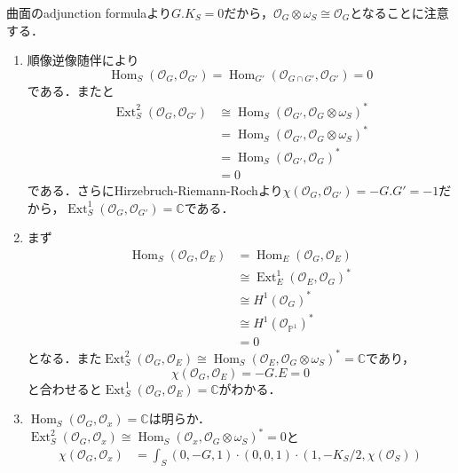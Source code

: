 \documentclass[uplatex,a4paper,11pt,dvipdfmx]{jsarticle}
\makeatletter
\theoremstyle{mystyle} %
\renewenvironment{proof}[1][\proofname]{\par
 \pushQED{\qed}%
 \normalfont \topsep6\p@\@plus6\p@\relax
 \trivlist
 \item[\hskip\labelsep
 \itshape
 {\bf\underline{#1}}]\ignorespaces
}{%
 \popQED\endtrivlist\@endpefalse
}
\DeclareMathOperator{\Hom}{Hom}
\DeclareMathOperator{\Ext}{Ext}
\makeatother
\begin{document}
\begin{proof}
	曲面のadjunction formulaより$G.K_S = 0$だから，$\mathcal{O}_G \otimes \omega_S \cong \mathcal{O}_G$となることに注意する．
	\begin{enumerate}
		\item 順像逆像随伴により$$\Hom_S(\mathcal{O}_G, \mathcal{O}_{G'}) = \Hom_{G'}(\mathcal{O}_{G\cap G'}, \mathcal{O}_{G'}) = 0$$である．またと
		      \begin{align*}
			      \Ext_S^2(\mathcal{O}_G, \mathcal{O}_{G'}) & \cong \Hom_S(\mathcal{O}_{G'}, \mathcal{O}_G \otimes \omega_S)^* \\
			                                                & =\Hom_S(\mathcal{O}_{G'}, \mathcal{O}_G \otimes \omega_S)^*      \\
			                                                & =\Hom_S(\mathcal{O}_{G'}, \mathcal{O}_G)^*                       \\
			                                                & =0
		      \end{align*}
		      である．さらにHirzebruch-Riemann-Rochより$\chi(\mathcal{O}_G, \mathcal{O}_{G'}) = -G.G' = -1$だから，$\Ext_S^1(\mathcal{O}_G, \mathcal{O}_{G'}) = \mathbb{C}$である．
		\item まず\begin{align*}
			      \Hom_S(\mathcal{O}_G, \mathcal{O}_E) & =\Hom_E(\mathcal{O}_G, \mathcal{O}_E)          \\
			                                           & \cong \Ext^1_E(\mathcal{O}_E, \mathcal{O}_G)^* \\
			                                           & \cong H^1(\mathcal{O}_G)^*                     \\
			                                           & \cong H^1(\mathcal{O}_{\mathbb{P}^1})^*        \\
			                                           & =0
		      \end{align*}
		      となる．また$\Ext^2_S(\mathcal{O}_G, \mathcal{O}_E)\cong\Hom_S(\mathcal{O}_E, \mathcal{O}_G\otimes \omega_S)^* =\mathbb{C}$であり，
		      $$\chi(\mathcal{O}_G, \mathcal{O}_E) = -G.E = 0$$と合わせると$\Ext^1_S(\mathcal{O}_G, \mathcal{O}_E) = \mathbb{C}$がわかる．
		\item $\Hom_S(\mathcal{O}_G, \mathcal{O}_x) = \mathbb{C}$は明らか．$\Ext^2_S(\mathcal{O}_G, \mathcal{O}_x)\cong \Hom_S(\mathcal{O}_x, \mathcal{O}_G\otimes \omega_S)^*=0$と
		      \begin{align*}
			      \chi(\mathcal{O}_G, \mathcal{O}_x) & =\int_S(0, -G, 1)\cdot(0, 0, 1)\cdot(1, -K_S/2, \chi(\mathcal{O}_S)) \\

\end{align*}
\end{enumerate}
\end{proof}
\end{document}
